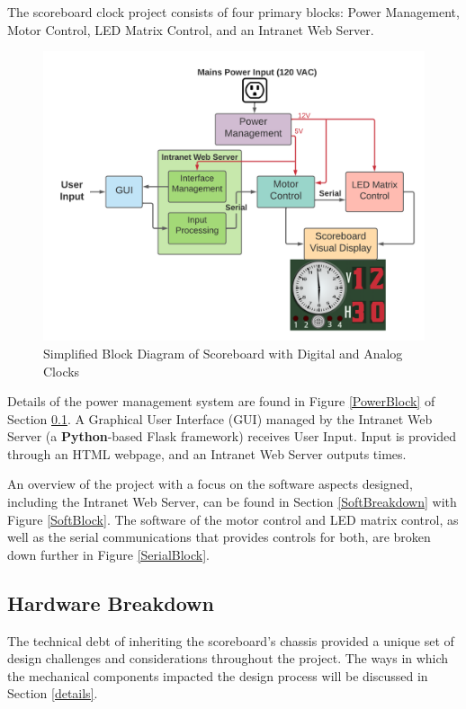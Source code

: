 \documentclass[11pt]{article}
\begin{document}
The scoreboard clock project consists of four primary blocks: Power Management, Motor Control, LED Matrix Control, and an Intranet Web Server. 

\begin{figure}[H]
\centering
\includegraphics[width=6in]{Functional_Block_Diagram.png}
\caption{Simplified Block Diagram of Scoreboard with Digital and Analog Clocks}
\label{OverallBlock}
\end{figure}

Details of the power management system are found in Figure \ref{PowerBlock} of Section \ref{HardBreakdown}.
A Graphical User Interface (GUI) managed by the Intranet Web Server (a \textbf{Python}-based Flask framework) receives User Input. 
Input is provided through an HTML webpage, and an Intranet Web Server outputs times. 

An overview of the project with a focus on the software aspects designed, including the Intranet Web Server, can be found in Section \ref{SoftBreakdown} with Figure \ref{SoftBlock}. 
The software of the motor control and LED matrix control, as well as the serial communications that provides controls for both, are broken down further in Figure \ref{SerialBlock}.

\subsection{Hardware Breakdown}
\label{HardBreakdown}

The technical debt of inheriting the scoreboard's chassis provided a unique set of design challenges and considerations throughout the project. 
The ways in which the mechanical components impacted the design process will be discussed in Section \ref{details}. 
\end{document}
